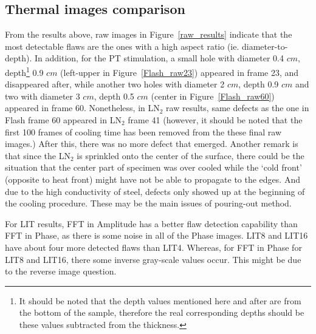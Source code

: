 \documentclass[]{spie}  %
\begin{document}
\subsection{Thermal images comparison} 

From the results above, raw images in Figure~\ref{raw_results} indicate that the most detectable flaws are the ones with a high aspect ratio (ie. diameter-to-depth). In addition, for the PT stimulation, a small hole with diameter 0.4 $cm$, depth\footnote{It should be noted that the depth values mentioned here and after are from the bottom of the sample, therefore the real corresponding depths should be these values subtracted from the thickness.} 0.9 $cm$ (left-upper in Figure~\ref{Flash_raw23}) appeared in frame 23, and disappeared after, while another two holes with diameter 2 $cm$, depth 0.9 $cm$ and two with diameter 3 $cm$, depth 0.5 $cm$ (center in Figure~\ref{Flash_raw60}) appeared in frame 60.  Nonetheless, in LN$_2$ raw results, same defects as the one in Flash frame 60 appeared in LN$_2$ frame 41 (however, it should be noted that the first 100 frames of cooling time has been removed from the these final raw images.) After this, there was no more defect that emerged. Another remark is that since the LN$_2$ is sprinkled onto the center of the surface, there could be the situation that the center part of specimen was over cooled while the `cold front' (opposite to heat front) might have not be able to propagate to the edges. And due to the high conductivity of steel, defects only showed up at the beginning of the cooling procedure. These may be the main issues of pouring-out method.

For LIT results, FFT in Amplitude has a better flaw detection capability than FFT in Phase, as there is some noise in all of the Phase images. LIT8 and LIT16 have about four more detected flaws than LIT4. Whereas, for FFT in Phase for LIT8 and LIT16, there some inverse gray-scale values occur. This might be due to the reverse image question.
\end{document}
